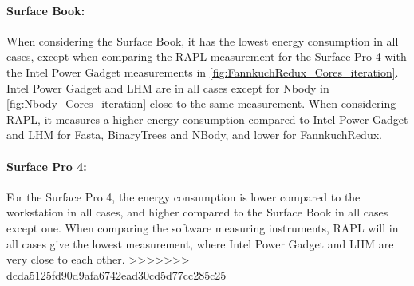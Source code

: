 \paragraph{Surface Book:} When considering the Surface Book, it has the lowest energy consumption in all cases, except when comparing the RAPL measurement for the Surface Pro 4 with the Intel Power Gadget measurements in \cref{fig:FannkuchRedux_Cores_iteration}. Intel Power Gadget and LHM are in all cases except for Nbody in \cref{fig:Nbody_Cores_iteration} close to the same measurement. When considering RAPL, it measures a higher energy consumption compared to Intel Power Gadget and LHM for Fasta, BinaryTrees and NBody, and lower for FannkuchRedux.

\paragraph{Surface Pro 4:} For the Surface Pro 4, the energy consumption is lower compared to the workstation in all cases, and higher compared to the Surface Book in all cases except one. When comparing the software measuring instruments, RAPL will in all cases give the lowest measurement, where Intel Power Gadget and LHM are very close to each other.
>>>>>>> dcda5125fd90d9afa6742ead30cd5d77cc285c25



